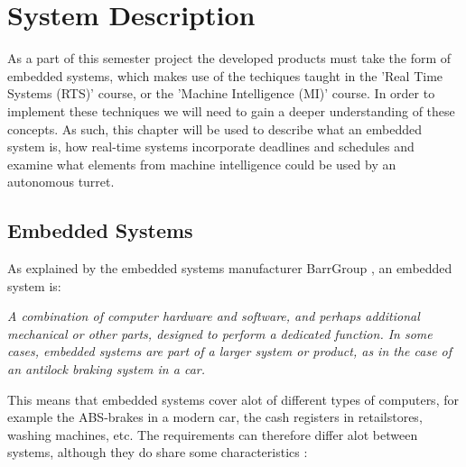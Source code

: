 \chapter{System Description}\label{SystemDescription}
As a part of this semester project the developed products must take the form of
embedded systems, which makes use of the techiques taught in the 'Real Time
Systems (RTS)' course, or the 'Machine Intelligence (MI)' course. In order to
implement these techniques we will need to gain a deeper understanding of these
concepts. As such, this chapter will be used to describe what an embedded system
is, how real-time systems incorporate deadlines and schedules and examine what
elements from machine intelligence could be used by an autonomous turret.

\section{Embedded Systems}
As explained by the embedded systems manufacturer BarrGroup
\citep{Barr_Embedded}, an embedded system is: \nl

\begin{center}
\begin{minipage}{0.8\linewidth}
\textit{A combination of computer hardware and software, and perhaps additional
mechanical or other parts, designed to perform a dedicated function. In some
cases, embedded systems are part of a larger system or product, as in the case
of an antilock braking system in a car.} 
\end{minipage}
\end{center}
% 

This means that embedded systems cover alot of different types of computers, for example
the ABS-brakes in a modern car, the cash registers in retailstores, washing machines, etc.
The requirements can therefore differ alot between systems, although they do
share some characteristics \citep[ch.1.1]{vahid1999embedded}:

